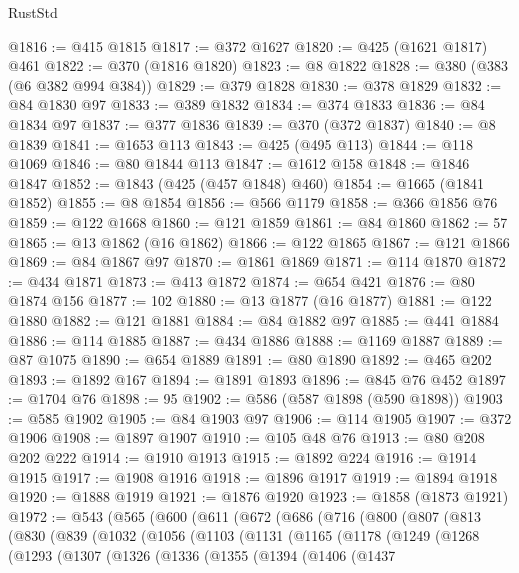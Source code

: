 \begin{lexlean}{RustStd}
\begin{coremodule}
@1816 := @415 @1815
@1817 := @372 @1627
@1820 := @425 (@1621 @1817) @461
@1822 := @370 (@1816 @1820)
@1823 := @8 @1822
@1828 := @380 (@383 (@6 @382 @994 @384))
@1829 := @379 @1828
@1830 := @378 @1829
@1832 := @84 @1830 @97
@1833 := @389 @1832
@1834 := @374 @1833
@1836 := @84 @1834 @97
@1837 := @377 @1836
@1839 := @370 (@372 @1837)
@1840 := @8 @1839
@1841 := @1653 @113
@1843 := @425 (@495 @113)
@1844 := @118 @1069
@1846 := @80 @1844 @113
@1847 := @1612 @158
@1848 := @1846 @1847
@1852 := @1843 (@425 (@457 @1848) @460)
@1854 := @1665 (@1841 @1852)
@1855 := @8 @1854
@1856 := @566 @1179
@1858 := @366 @1856 @76
@1859 := @122 @1668
@1860 := @121 @1859
@1861 := @84 @1860
@1862 := 57
@1865 := @13 @1862 (@16 @1862)
@1866 := @122 @1865
@1867 := @121 @1866
@1869 := @84 @1867 @97
@1870 := @1861 @1869
@1871 := @114 @1870
@1872 := @434 @1871
@1873 := @413 @1872
@1874 := @654 @421
@1876 := @80 @1874 @156
@1877 := 102
@1880 := @13 @1877 (@16 @1877)
@1881 := @122 @1880
@1882 := @121 @1881
@1884 := @84 @1882 @97
@1885 := @441 @1884
@1886 := @114 @1885
@1887 := @434 @1886
@1888 := @1169 @1887
@1889 := @87 @1075
@1890 := @654 @1889
@1891 := @80 @1890
@1892 := @465 @202
@1893 := @1892 @167
@1894 := @1891 @1893
@1896 := @845 @76 @452
@1897 := @1704 @76
@1898 := 95
@1902 := @586 (@587 @1898 (@590 @1898))
@1903 := @585 @1902
@1905 := @84 @1903 @97
@1906 := @114 @1905
@1907 := @372 @1906
@1908 := @1897 @1907
@1910 := @105 @48 @76
@1913 := @80 @208 @202 @222
@1914 := @1910 @1913
@1915 := @1892 @224
@1916 := @1914 @1915
@1917 := @1908 @1916
@1918 := @1896 @1917
@1919 := @1894 @1918
@1920 := @1888 @1919
@1921 := @1876 @1920
@1923 := @1858 (@1873 @1921)
@1972 := @543
    (@565
      (@600
        (@611
          (@672
            (@686
              (@716
                (@800
                  (@807
                    (@813
                      (@830
                        (@839
                          (@1032
                            (@1056
                              (@1103
                                (@1131
                                  (@1165
                                    (@1178
                                      (@1249
                                        (@1268
                                          (@1293
                                            (@1307
                                              (@1326
                                                (@1336
                                                  (@1355
                                                    (@1394
                                                      (@1406
                                                        (@1437

\end{coremodule}
\end{lexlean}

